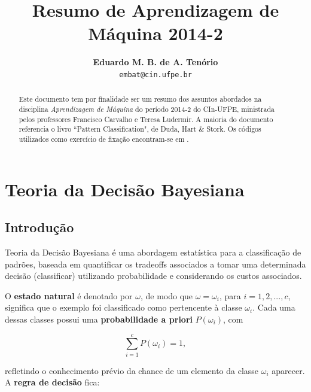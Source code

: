 \documentclass[a4paper,12pt,twocolumn]{article}
\begin{document}
\title{\textbf{Resumo de Aprendizagem de Máquina 2014-2}}
\author{
    \textbf{Eduardo M. B. de A. Tenório}\\
    \small{\texttt{embat@cin.ufpe.br}}
}
\date{}

\maketitle


\begin{abstract}
\begin{itshape}
Este documento tem por finalidade ser um resumo dos assuntos abordados na disciplina \emph{Aprendizagem de Máquina} do período 2014-2 do CIn-UFPE, ministrada pelos professores Francisco Carvalho e Teresa Ludermir. A maioria do documento referencia o livro ``Pattern Classification", de Duda, Hart \& Stork. Os códigos utilizados como exercício de fixação encontram-se em .
\end{itshape}
\end{abstract}


\section{Teoria da Decisão Bayesiana}

\subsection{Introdução}

Teoria da Decisão Bayesiana é uma abordagem estatística para a classificação de
padrões, baseada em quantificar os tradeoffs associados a tomar uma determinada
decisão (classificar) utilizando probabilidade e considerando os custos associados.

O \textbf{estado natural} é denotado por $\omega$, de modo que $\omega = \omega_i$, para $i = 1, 2, ..., c$, significa que o exemplo foi classificado como pertencente à classe $\omega_i$. Cada uma dessas classes possui uma \textbf{probabilidade a priori} $P(\omega_i)$, com

\begin{equation}
    \sum_{i=1}^{c} P(\omega_i) = 1,
    \label{eq:sum_priori_prob_to_one}
\end{equation}

\noindent refletindo o conhecimento prévio da chance de um elemento da classe $\omega_i$ aparecer. A \textbf{regra de decisão} fica:
\end{document}
